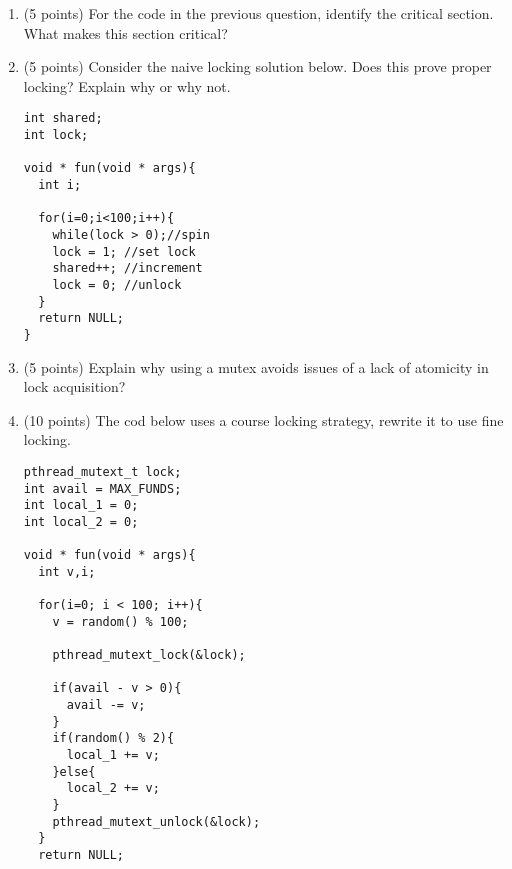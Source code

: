 \documentclass{article}[9pt]
\newenvironment{answerfont}{\fontfamily{qhv}\selectfont}{\par}
\newenvironment{myanswer}{\begin{mdframed}\begin{answerfont}}{\end{answerfont}\end{mdframed}}
\begin{document}
\begin{enumerate}
\begin{verbatim}
void * fun(void * args){
  int i;
  for(i=0;i<100;i++){
    shared++;
  }
  return NULL;
}
int main(){
  pthread_t t1,t2;
  pthread_create(&t1, NULL, fun, NULL);
  pthread_create(&t2, NULL, fun, NULL);

  pthread_join(t1, NULL);
  pthread_join(t2, NULL);

  printf("shared: %d\n", shared);
}
\end{verbatim}  
\begin{myanswer}
  \end{myanswer}

\item (5 points) For the code in the previous question, identify the critical section. What makes this section critical?
\begin{myanswer}
  \end{myanswer}

\item (5 points) Consider the naive locking solution below. Does this prove proper locking? Explain why or why not.
\begin{verbatim}
int shared;
int lock;

void * fun(void * args){
  int i;

  for(i=0;i<100;i++){
    while(lock > 0);//spin
    lock = 1; //set lock
    shared++; //increment
    lock = 0; //unlock
  }
  return NULL;
}
\end{verbatim}
\begin{myanswer}
  \end{myanswer}

\item (5 points) Explain why using a mutex avoids issues of a lack of atomicity in lock acquisition?
\begin{myanswer}
  \end{myanswer}

\item (10 points) The cod below uses a course locking strategy, rewrite it to use fine locking.
	\begin{verbatim}
pthread_mutext_t lock;
int avail = MAX_FUNDS;
int local_1 = 0;
int local_2 = 0;

void * fun(void * args){
  int v,i;

  for(i=0; i < 100; i++){
    v = random() % 100;

    pthread_mutext_lock(&lock);

    if(avail - v > 0){
      avail -= v;
    }
    if(random() % 2){
      local_1 += v;
    }else{
      local_2 += v;
    }
    pthread_mutext_unlock(&lock);
  }
  return NULL;


\end{verbatim}
\end{enumerate}
\end{document}
